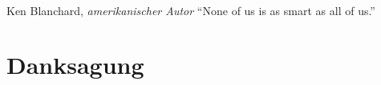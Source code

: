 \documentclass[12pt, a4paper, oneside, ngerman]{article}
\begin{document}

\setcounter{page}{1}


\paragraph{}$~~$\\

\begin{chapquote}{Ken Blanchard, \textit{amerikanischer Autor}}
{\Large``None of us is as smart as all of us.''}
\end{chapquote}

\section*{Danksagung}
\lipsum[1]


\newpage











\setcounter{biburllcpenalty}{7000}
\setcounter{biburlucpenalty}{8000}
\printbibliography[heading=bibintoc]
\newpage
\clearpage


\end{document}
